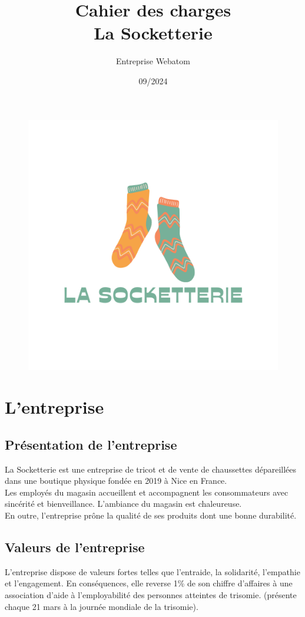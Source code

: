 \documentclass[a4paper, 12pt]{article}
\title{Cahier des charges\\
La Socketterie}
\author{Entreprise Webatom}
\date{09/2024}
\begin{document}
\maketitle
\begin{figure}[H]
    \centering
    \includegraphics[scale=1]{La socketterie.png}
\end{figure}
\clearpage

\tableofcontents
\newpage
\section{L'entreprise}
\subsection{Présentation de l'entreprise}
La Socketterie est une entreprise de tricot et de vente de chaussettes dépareillées dans une boutique physique fondée en 2019 à Nice en France.\\
Les employés du magasin accueillent et accompagnent les consommateurs avec sincérité et bienveillance. L'ambiance du magasin est chaleureuse.\\
En outre, l'entreprise prône la qualité de ses produits dont une bonne durabilité.
\subsection{Valeurs de l'entreprise}
L'entreprise dispose de valeurs fortes telles que l'entraide, la solidarité, l'empathie et l'engagement. 
En conséquences, elle reverse 1\% de son chiffre d'affaires à une association d'aide à l'employabilité des personnes atteintes de trisomie. (présente chaque 21 mars à la journée mondiale de la trisomie).\\
\end{document}
